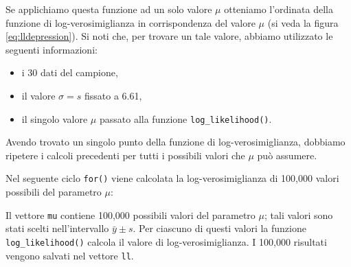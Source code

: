 \documentclass[
]{memoir}
\newenvironment{Shaded}{\begin{snugshade}}{\end{snugshade}}
\newcommand{\AttributeTok}[1]{\textcolor[rgb]{0.77,0.63,0.00}{#1}}
\newcommand{\ConstantTok}[1]{\textcolor[rgb]{0.00,0.00,0.00}{#1}}
\newcommand{\ControlFlowTok}[1]{\textcolor[rgb]{0.13,0.29,0.53}{\textbf{#1}}}
\newcommand{\DecValTok}[1]{\textcolor[rgb]{0.00,0.00,0.81}{#1}}
\newcommand{\FloatTok}[1]{\textcolor[rgb]{0.00,0.00,0.81}{#1}}
\newcommand{\FunctionTok}[1]{\textcolor[rgb]{0.00,0.00,0.00}{#1}}
\newcommand{\NormalTok}[1]{#1}
\newcommand{\OtherTok}[1]{\textcolor[rgb]{0.56,0.35,0.01}{#1}}
\newcommand{\SpecialCharTok}[1]{\textcolor[rgb]{0.00,0.00,0.00}{#1}}
\providecommand{\tightlist}{%
  \setlength{\itemsep}{0pt}\setlength{\parskip}{0pt}}
\theoremstyle{definition}
\theoremstyle{definition}
\theoremstyle{definition}
\theoremstyle{definition}
\theoremstyle{remark}
\begin{document}
Se applichiamo questa funzione ad un solo valore \(\mu\) otteniamo l'ordinata della funzione di log-verosimiglianza in corrispondenza del valore \(\mu\) (si veda la figura \eqref{eq:lldepression}). Si noti che, per trovare un tale valore, abbiamo utilizzato le seguenti informazioni:

\begin{itemize}
\tightlist
\item
  i 30 dati del campione,
\item
  il valore \(\sigma = s\) fissato a 6.61,
\item
  il singolo valore \(\mu\) passato alla funzione \texttt{log\_likelihood()}.
\end{itemize}

Avendo trovato un singolo punto della funzione di log-verosimiglianza, dobbiamo ripetere i calcoli precedenti per tutti i possibili valori che \(\mu\) può assumere.

Nel seguente ciclo \texttt{for()} viene calcolata la log-verosimiglianza di 100,000 valori possibili del parametro \(\mu\):

\begin{Shaded}
\end{Shaded}

Il vettore \texttt{mu} contiene 100,000 possibili valori del parametro \(\mu\); tali valori sono stati scelti nell'intervallo \(\bar{y} \pm s\). Per ciascuno di questi valori la funzione \texttt{log\_likelihood()} calcola il valore di log-verosimiglianza. I 100,000 risultati vengono salvati nel vettore \texttt{ll}.
\end{document}
